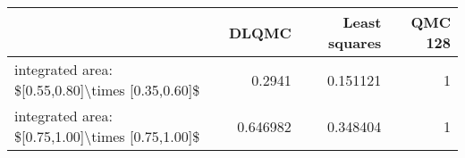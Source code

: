 \begin{tabular}{lrrr}
\toprule
                                                  &    DLQMC &   Least squares &   QMC 128 \\
\midrule
 integrated area: \$[0.55,0.80]\textbackslash{}times [0.35,0.60]\$ & 0.2941   &        0.151121 &         1 \\
 integrated area: \$[0.75,1.00]\textbackslash{}times [0.75,1.00]\$ & 0.646982 &        0.348404 &         1 \\
\bottomrule
\end{tabular}
